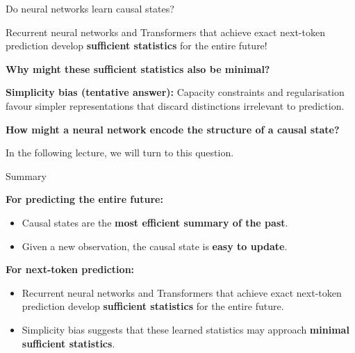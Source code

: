 \documentclass[aspectratio=169,12pt,t]{beamer}
\begin{document}
\begin{frame}{Do neural networks learn causal states?}
  \setlength{\parskip}{0pt}
  \vfill

  Recurrent neural networks and Transformers that achieve exact next-token
  prediction develop \textbf{sufficient statistics} for the entire future!

  \vspace{10mm}
  \textbf{Why might these sufficient statistics also be minimal?}

  \vspace{3mm}
  \textbf{Simplicity bias (tentative answer):} Capacity constraints and regularisation favour
  simpler representations that discard distinctions irrelevant to prediction.

  \vspace{9mm}
  \textbf{How might a neural network encode the structure of a causal state?}

  \vspace{3mm}
  In the following lecture, we will turn to this question.

  \vfill

\end{frame}

\begin{frame}{Summary}
  \setlength{\parskip}{0pt}
  \vfill

  \textbf{For predicting the entire future:}

  \vspace{2mm}
  \begin{itemize}
    \item Causal states are the \textbf{most efficient summary of the past}.
    \item Given a new observation, the causal state is \textbf{easy to update}.
  \end{itemize}

  \vspace{7mm}
  \textbf{For next-token prediction:}

  \vspace{2mm}
  \begin{itemize}
    \item Recurrent neural networks and Transformers that achieve exact
      next-token prediction develop \textbf{sufficient statistics} for the
      entire future.
    \item Simplicity bias suggests that these learned statistics may approach
      \textbf{minimal sufficient statistics}.
  \end{itemize}

  \vfill
\end{frame}
\end{document}
